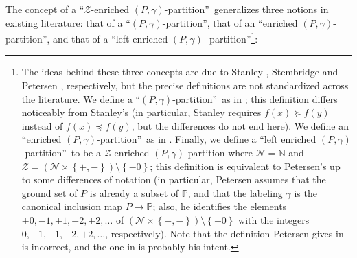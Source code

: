 \documentclass[numbers=enddot,12pt,final,onecolumn,notitlepage]{scrartcl}%
\theoremstyle{definition}
\begin{document}
The concept of a \textquotedblleft$\mathcal{Z}$-enriched $\left(
P,\gamma\right)  $-partition\textquotedblright\ generalizes three notions in
existing literature: that of a \textquotedblleft$\left(  P,\gamma\right)
$-partition\textquotedblright, that of an \textquotedblleft enriched $\left(
P,\gamma\right)  $-partition\textquotedblright, and that of a
\textquotedblleft left enriched $\left(  P,\gamma\right)  $%
-partition\textquotedblright\footnote{The ideas behind these three concepts
are due to Stanley \cite{Stanle72}, Stembridge \cite[\S 2]{Stembr97} and
Petersen \cite{Peters05}, respectively, but the precise definitions are not
standardized across the literature. We define a \textquotedblleft$\left(
P,\gamma\right)  $-partition\textquotedblright\ as in \cite[\S 1.1]{Stembr97};
this definition differs noticeably from Stanley's (in particular, Stanley
requires $f\left(  x\right)  \succcurlyeq f\left(  y\right)  $ instead of
$f\left(  x\right)  \preccurlyeq f\left(  y\right)  $, but the differences do
not end here). We define an \textquotedblleft enriched $\left(  P,\gamma
\right)  $-partition\textquotedblright\ as in \cite[\S 2]{Stembr97}. Finally,
we define a \textquotedblleft left enriched $\left(  P,\gamma\right)
$-partition\textquotedblright\ to be a $\mathcal{Z}$-enriched $\left(
P,\gamma\right)  $-partition where $\mathcal{N}=\mathbb{N}$ and $\mathcal{Z}%
=\left(  \mathcal{N}\times\left\{  +,-\right\}  \right)  \setminus\left\{
-0\right\}  $; this definition is equivalent to Petersen's
\cite[Definition 3.4.1]{Peters06} up to some differences of notation
(in particular, Petersen assumes that the ground set of $P$ is already
a subset of $\mathbb{P}$, and that the labeling $\gamma$ is the
canonical inclusion map $ P \to \mathbb{P}$; also, he identifies the elements
$+0, -1, +1, -2, +2, \ldots$ of
$\left(  \mathcal{N}\times\left\{  +,-\right\}  \right)  \setminus\left\{
-0\right\}  $ with the integers
$0, -1, +1, -2, +2, \ldots$, respectively).
Note that the definition Petersen gives in \cite[Definition 4.1]{Peters05}
is incorrect, and the one in \cite[Definition 3.4.1]{Peters06} is probably
his intent.}:
\end{document}
